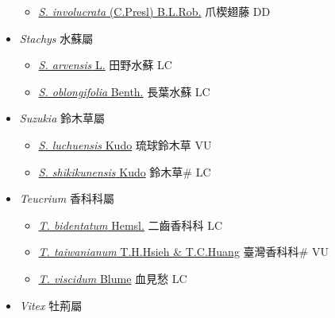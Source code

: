 \begin{itemize}
  \begin{itemize}
        \item[] \href{http://www.theplantlist.org/tpl1.1/search?q=Sphenodesme+involucrata}{\textit{S. involucrata} (C.Presl) B.L.Rob.}   爪楔翅藤 DD
  \end{itemize}
 \item[] \textit{Stachys} 水蘇屬
                    
  \begin{itemize}
        \item[] \href{http://www.theplantlist.org/tpl1.1/search?q=Stachys+arvensis}{\textit{S. arvensis} L.}   田野水蘇 LC
        \item[] \href{http://www.theplantlist.org/tpl1.1/search?q=Stachys+oblongifolia}{\textit{S. oblongifolia} Benth.}   長葉水蘇 LC
  \end{itemize}
 \item[] \textit{Suzukia} 鈴木草屬
                    
  \begin{itemize}
        \item[] \href{http://www.theplantlist.org/tpl1.1/search?q=Suzukia+luchuensis}{\textit{S. luchuensis} Kudo}   琉球鈴木草 VU
        \item[] \href{http://www.theplantlist.org/tpl1.1/search?q=Suzukia+shikikunensis}{\textit{S. shikikunensis} Kudo}   鈴木草\# LC
  \end{itemize}
 \item[] \textit{Teucrium} 香科科屬
                    
  \begin{itemize}
        \item[] \href{http://www.theplantlist.org/tpl1.1/search?q=Teucrium+bidentatum}{\textit{T. bidentatum} Hemsl.}   二齒香科科 LC
        \item[] \href{http://www.theplantlist.org/tpl1.1/search?q=Teucrium+taiwanianum}{\textit{T. taiwanianum} T.H.Hsieh \& T.C.Huang}   臺灣香科科\# VU
        \item[] \href{http://www.theplantlist.org/tpl1.1/search?q=Teucrium+viscidum}{\textit{T. viscidum} Blume}   血見愁 LC
  \end{itemize}
 \item[] \textit{Vitex} 牡荊屬
                    

\end{itemize}
